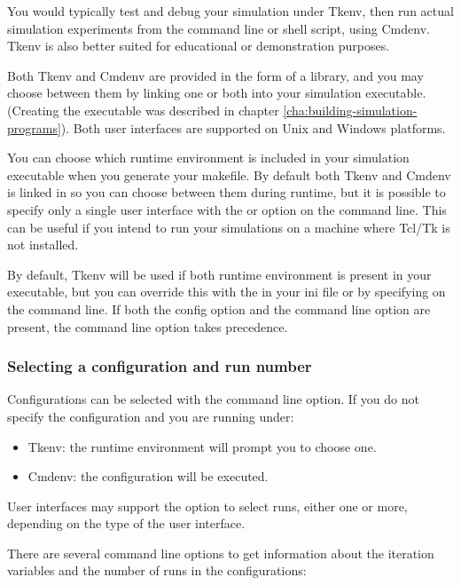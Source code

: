 You would typically test and debug your simulation under Tkenv,
then run actual simulation experiments from the command line or
shell script, using Cmdenv. Tkenv is also better suited for educational or
demonstration purposes.

Both Tkenv and Cmdenv are provided in the form of a library, and
you may choose between them by linking one or both into your
simulation executable. (Creating the executable was described in
chapter \ref{cha:building-simulation-programs}). Both user interfaces
are supported on Unix and Windows platforms.

You can choose which runtime environment is included in your simulation executable when
you generate your makefile. By default both Tkenv and Cmdenv is linked in so you can choose
between them during runtime, but it is possible to specify only a single user interface with the
 or  option on the  command line. This can be
useful if you intend to run your simulations on a machine where Tcl/Tk is not installed.

By default, Tkenv will be used if both runtime environment is present in your executable,
but you can override this with the  in your ini file or by
specifying  on the command line. If both the config option and
the command line option are present, the command line option takes precedence.

\subsubsection{Selecting a configuration and run number}

Configurations can be selected with the  command line option.
If you do not specify the configuration and you are running under:

\begin{itemize}
  \item Tkenv: the runtime environment will prompt you to choose one.
  \item Cmdenv: the  configuration will be executed.
\end{itemize}

User interfaces may support the  option to select runs,
either one or more, depending on the type of the user interface.

There are several command line options to get information about the iteration
variables and the number of runs in the configurations:

